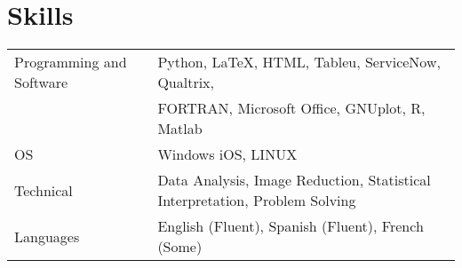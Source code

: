 \documentclass[]{deedy-resume-openfont}
\begin{document}
\begin{minipage}[t]{0.9\textwidth}



\section{Skills}
\begin{tabular}{ll}
Programming and Software & 

Python, 
\LaTeX, 
HTML, 
Tableu, 
ServiceNow,
Qualtrix,\\
 &

FORTRAN, 
Microsoft Office, 
GNUplot, 
R, 
Matlab \\

OS & 


Windows 
iOS, 
LINUX \\

Technical &

Data Analysis, 
Image Reduction, 
Statistical Interpretation, 
Problem Solving \\

Languages & 
English (Fluent),
Spanish (Fluent),
French (Some)
\end{tabular}






\end{minipage} 
\end{document}
